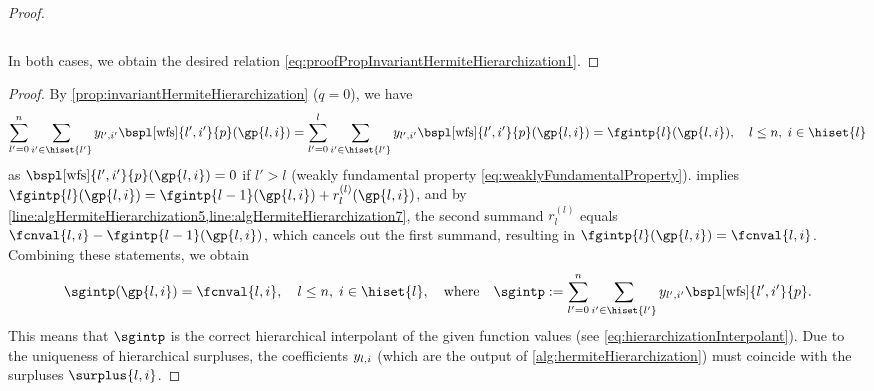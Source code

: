 \begin{proof}
\begin{itemize}
\begin{equation}
    \end{equation}
  \end{itemize}
  In both cases, we obtain the desired relation
  \eqref{eq:proofPropInvariantHermiteHierarchization1}.
\end{proof}

\corAlgHermiteHierarchizationCorrectness*

\begin{proof}
  By \cref{prop:invariantHermiteHierarchization} ($q = 0$), we have
  \begin{equation}
  \sum_{l'=0}^n \sum_{i' \in \hiset{l'}}
  \linout{l',i'} \bspl[\wfs]{l',i'}{p}(\gp{l,i})
  = \sum_{l'=0}^l \sum_{i' \in \hiset{l'}}
  \linout{l',i'} \bspl[\wfs]{l',i'}{p}(\gp{l,i})
  = \fgintp{l}(\gp{l,i}),\quad
  l \le n,\; i \in \hiset{l}
  \end{equation}
  as $\bspl[\wfs]{l',i'}{p}(\gp{l,i}) = 0$ if $l' > l$
  (weakly fundamental property \eqref{eq:weaklyFundamentalProperty}).
   implies
  $\fgintp{l}(\gp{l,i})
  = \fgintp{l-1}(\gp{l,i}) + r^{(l)}_l(\gp{l,i})$,
  and by \cref{line:algHermiteHierarchization5,line:algHermiteHierarchization7},
  the second summand $r^{(l)}_l$ equals $\fcnval{l,i} - \fgintp{l-1}(\gp{l,i})$,
  which cancels out the first summand, resulting in
  $\fgintp{l}(\gp{l,i}) = \fcnval{l,i}$.
  Combining these statements, we obtain
  \begin{equation}
  \sgintp(\gp{l,i})
  = \fcnval{l,i},\quad
  l \le n,\; i \in \hiset{l},
  \quad\text{where}\quad
  \sgintp
  := \sum_{l'=0}^n \sum_{i' \in \hiset{l'}}
  \linout{l',i'} \bspl[\wfs]{l',i'}{p}.
  \end{equation}
  This means that $\sgintp$ is the correct hierarchical interpolant
  of the given function values
  (see \cref{eq:hierarchizationInterpolant}).
  Due to the uniqueness of hierarchical surpluses,
  the coefficients $\linout{l,i}$
  (which are the output of \cref{alg:hermiteHierarchization})
  must coincide with the surpluses $\surplus{l,i}$.
\end{proof}
